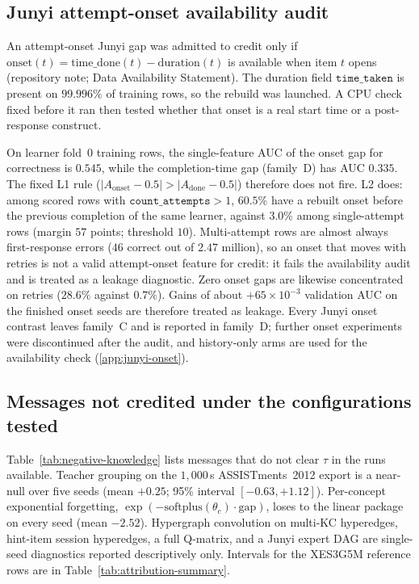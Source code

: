 \documentclass[review,12pt]{elsarticle}
\begin{document}


\subsection{Junyi attempt-onset availability audit}
\label{sec:junyi-onset-audit}
An attempt-onset Junyi gap was admitted to credit only if
$\mathrm{onset}(t)=\mathrm{time\_done}(t)-\mathrm{duration}(t)$ is
available when item $t$ opens (repository note; Data Availability
Statement). The duration field $\texttt{time\_taken}$ is present on
$99.996\%$ of training rows, so the rebuild was launched. A CPU check
fixed before it ran then tested whether that onset is a real start time
or a post-response construct.

On learner fold~0 training rows, the single-feature AUC of the onset
gap for correctness is $0.545$, while the completion-time gap (family~D)
has AUC $0.335$. The fixed L1 rule
($|A_{\mathrm{onset}}-0.5|>|A_{\mathrm{done}}-0.5|$) therefore does not
fire. L2 does: among scored rows with $\texttt{count\_attempts}>1$,
$60.5\%$ have a rebuilt onset before the previous completion of the
same learner, against $3.0\%$ among single-attempt rows (margin
$57$ points; threshold $10$). Multi-attempt rows are almost always
first-response errors ($46$ correct out of $2.47$ million), so an onset
that moves with retries is not a valid attempt-onset feature for credit:
it fails the availability audit and is treated as a leakage diagnostic.
Zero onset
gaps are likewise concentrated on retries ($28.6\%$ against $0.7\%$).
Gains of about $+65\times 10^{-3}$ validation AUC on the finished onset
seeds are therefore treated as leakage. Every Junyi onset contrast
leaves family~C and is reported in family~D; further onset experiments
were discontinued after the audit, and history-only arms are used for
the availability check (\ref{app:junyi-onset}).

\subsection{Messages not credited under the configurations tested}
\label{sec:below-rule}
Table~\ref{tab:negative-knowledge} lists messages that do not clear
$\tau$ in the runs available. Teacher grouping on the $1{,}000$\,s
ASSISTments~2012 export is a near-null over five seeds (mean $+0.25$;
95\% interval $[{-}0.63,{+}1.12]$). Per-concept exponential forgetting,
$\exp(-\mathrm{softplus}(\theta_c)\cdot\mathrm{gap})$, loses to the
linear package on every seed (mean $-2.52$). Hypergraph convolution
on multi-KC hyperedges, hint-item session hyperedges, a full Q-matrix,
and a Junyi expert DAG are single-seed diagnostics reported
descriptively only.
Intervals for the XES3G5M reference rows are in
Table~\ref{tab:attribution-summary}.
\end{document}
